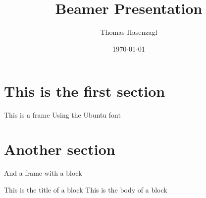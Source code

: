 \documentclass[xcolor=svgnames,compress]{beamer}
\author{Thomas Hasenzagl}
\title{Beamer Presentation}
\date{\today}
\begin{document}
\maketitle 

\section{This is the first section}

\begin{frame}{This is a frame}
   Using the Ubuntu font
\end{frame}

\section{Another section}

\begin{frame}{And a frame with a block}
    \begin{block}{This is the title of a block}
    This is the body of a block 
    \end{block}
\end{frame}
\end{document}
